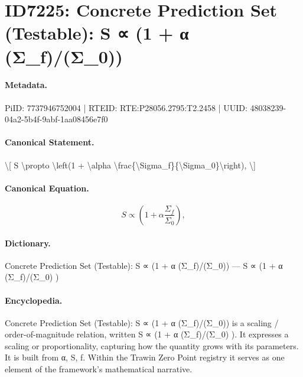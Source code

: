 \section*{ID7225: Concrete Prediction Set (Testable): S ∝ (1 + α (Σ\_f)/(Σ\_0))}
\paragraph{Metadata.}
PiID: 7737946752004 | RTEID: RTE:P28056.2795:T2.2458 | UUID: 48038239-04a2-5b4f-9abf-1aa08456e7f0

\paragraph{Canonical Statement.}
\textbackslash{}[ S \textbackslash{}propto \textbackslash{}left(1 + \textbackslash{}alpha \textbackslash{}frac\{\textbackslash{}Sigma\_f\}\{\textbackslash{}Sigma\_0\}\textbackslash{}right), \textbackslash{}]

\paragraph{Canonical Equation.}
\[
S \propto \left(1 + \alpha \frac{\Sigma_f}{\Sigma_0}\right),
\]

\paragraph{Dictionary.}
Concrete Prediction Set (Testable): S ∝ (1 + α (Σ\_f)/(Σ\_0)) — S ∝ (1 + α (Σ\_f)/(Σ\_0) )

\paragraph{Encyclopedia.}
Concrete Prediction Set (Testable): S ∝ (1 + α (Σ\_f)/(Σ\_0)) is a scaling / order-of-magnitude relation, written S ∝ (1 + α (Σ\_f)/(Σ\_0) ). It expresses a scaling or proportionality, capturing how the quantity grows with its parameters. It is built from α, S, f. Within the Trawin Zero Point registry it serves as one element of the framework's mathematical narrative.
